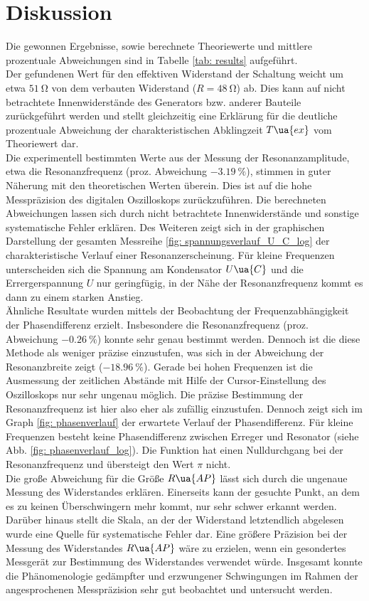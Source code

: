 \section{Diskussion}
Die gewonnen Ergebnisse, sowie berechnete Theoriewerte und mittlere prozentuale Abweichungen sind in Tabelle \ref{tab: results} aufgeführt. \\
Der gefundenen Wert für den effektiven Widerstand der Schaltung weicht um etwa $\SI{51}{\ohm}$ von dem verbauten Widerstand ($R =  \SI{48}{\ohm}$) ab. Dies kann
auf nicht betrachtete Innenwiderstände des Generators bzw. anderer Bauteile zurückgeführt werden und stellt
gleichzeitig eine Erklärung für die deutliche prozentuale Abweichung der charakteristischen Abklingzeit $T\ua{ex}$ vom Theoriewert dar.\\
Die experimentell bestimmten Werte aus der Messung der Resonanzamplitude, etwa die Resonanzfrequenz (proz. Abweichung $\SI{-3.19}{\percent}$),
stimmen in guter Näherung mit den theoretischen Werten überein. Dies ist auf die hohe Messpräzision des digitalen Oszilloskops zurückzuführen.
Die berechneten Abweichungen lassen sich durch nicht betrachtete Innenwiderstände und sonstige systematische Fehler erklären. Des Weiteren zeigt
sich in der graphischen Darstellung der gesamten Messreihe \ref{fig: spannungsverlauf_U_C_log} der charakteristische Verlauf einer Resonanzerscheinung.
Für kleine Frequenzen unterscheiden sich die Spannung am Kondensator $U\ua{C}$ und die Errergerspannung $U$ nur geringfügig, in der Nähe
der Resonanzfrequenz kommt es dann zu einem starken Anstieg.\\
Ähnliche Resultate wurden mittels der Beobachtung der Frequenzabhängigkeit der Phasendifferenz erzielt.
Insbesondere die Resonanzfrequenz (proz. Abweichung $\SI{-0.26}{\percent}$) konnte
sehr genau bestimmt werden. Dennoch ist die diese Methode als weniger präzise einzustufen, was sich in der Abweichung der Resonanzbreite
zeigt ($\SI{-18.96}{\percent}$). Gerade bei hohen Frequenzen ist die Ausmessung der zeitlichen Abstände mit Hilfe der Cursor-Einstellung des Oszilloskops
nur sehr ungenau möglich. Die präzise Bestimmung der Resonanzfrequenz ist hier also eher als zufällig einzustufen. Dennoch zeigt sich im Graph \ref{fig: phasenverlauf}
der erwartete Verlauf der Phasendifferenz. Für kleine Frequenzen besteht keine Phasendifferenz zwischen Erreger und Resonator (siehe Abb. \ref{fig: phasenverlauf_log}).
Die Funktion hat einen Nulldurchgang bei der Resonanzfrequenz und übersteigt den Wert $\pi$ nicht.\\
Die große Abweichung für die Größe $R\ua{AP}$ lässt sich durch die ungenaue Messung des Widerstandes erklären. Einerseits kann der gesuchte Punkt,
an dem es zu keinen Überschwingern mehr kommt, nur sehr schwer erkannt werden. Darüber hinaus stellt die Skala, an der der Widerstand
letztendlich abgelesen wurde eine Quelle für systematische Fehler dar. Eine größere Präzision bei der Messung des Widerstandes $R\ua{AP}$ wäre zu erzielen,
wenn ein gesondertes Messgerät zur Bestimmung des Widerstandes verwendet würde.
Insgesamt konnte die Phänomenologie gedämpfter und erzwungener Schwingungen im Rahmen der angesprochenen Messpräzision sehr gut beobachtet und untersucht werden.


